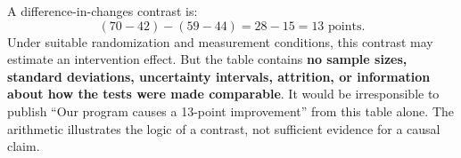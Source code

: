 A difference-in-changes contrast is:
\begin{equation}
(70 - 42) - (59 - 44) = 28 - 15 = 13\text{ points}.
\end{equation}
Under suitable randomization and measurement conditions, this contrast may estimate an intervention effect. But the table contains \textbf{no sample sizes, standard deviations, uncertainty intervals, attrition, or information about how the tests were made comparable}. It would be irresponsible to publish ``Our program causes a 13-point improvement'' from this table alone. The arithmetic illustrates the logic of a contrast, not sufficient evidence for a causal claim.
